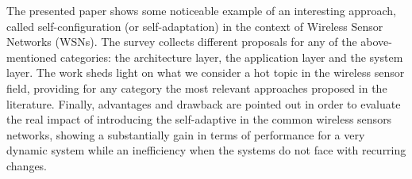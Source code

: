 The presented paper shows some noticeable example of an interesting approach,
called self-configuration (or self-adaptation) in the context of Wireless Sensor
Networks (WSNs). The survey collects different proposals for any of the
above-mentioned categories: the architecture layer, the application layer and
the system layer.  The work sheds light on what we consider a hot topic in the
wireless sensor field, providing for any category the most relevant approaches
proposed in the literature.  Finally, advantages and drawback are pointed out in
order to evaluate the real impact of introducing the self-adaptive in the common
wireless sensors networks, showing a substantially gain in terms of performance
for a very dynamic system while an inefficiency when the systems do not face
with recurring changes.
